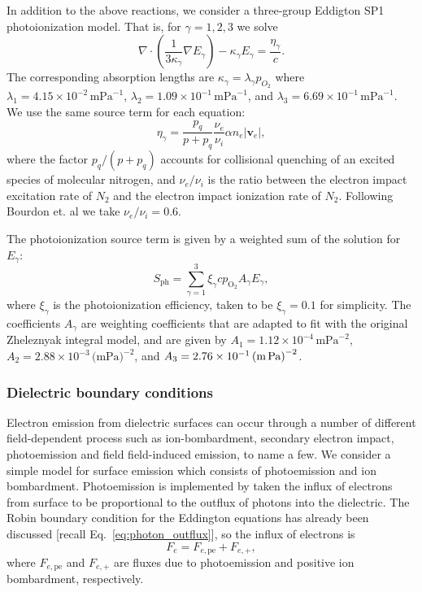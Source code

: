 \documentclass[3p]{elsarticle}
\begin{document}
In addition to the above reactions, we consider a three-group Eddigton SP1 photoionization model. That is, for $\gamma = 1, 2, 3$ we solve
\begin{equation}
  \nabla\cdot\left(\frac{1}{3\kappa_\gamma}\nabla E_\gamma\right) - \kappa_\gamma E_\gamma = \frac{\eta_\gamma}{c}. 
\end{equation}
The corresponding absorption lengths are $\kappa_\gamma = \lambda_\gamma p_{O_2}$ where $\lambda_1 = 4.15\times 10^{-2}\,\text{mPa}^{-1}$, $\lambda_2 = 1.09\times 10^{-1}\,\text{mPa}^{-1}$, and $\lambda_3 = 6.69\times 10^{-1}\,\text{mPa}^{-1}$. We use the same source term for each equation:
\begin{equation}
  \eta_\gamma = \frac{p_q}{p + p_q}\frac{\nu_e}{\nu_i}\alpha n_e\left|\bm{v}_e\right|,
\end{equation}
where the factor $p_q/(p+p_q)$ accounts for collisional quenching of an excited species of molecular nitrogen, and $\nu_e/\nu_i$ is the ratio between the electron impact excitation rate of $N_2$ and the electron impact ionization rate of $N_2$. Following Bourdon et. al we take $\nu_e/\nu_i = 0.6$.

The photoionization source term is given by a weighted sum of the solution for $E_\gamma$:
\begin{equation}
  S_{\text{ph}} = \sum_{\gamma = 1}^3 \xi_\gamma c p_{\text{O}_2}A_\gamma E_\gamma,
\end{equation}
where $\xi_\gamma$ is the photoionization efficiency, taken to be $\xi_\gamma = 0.1$ for simplicity. The coefficients $A_\gamma$ are weighting coefficients that are adapted to fit with the original Zheleznyak integral model, and are given by $A_1 = 1.12\times 10^{-4}\,\text{mPa}^{-2}$, $A_2 = 2.88\times 10^{-3}\,\text{(mPa)}^{-2}$, and $A_3 = 2.76\times 10^{-1}\,\text{(m\,Pa)}^{-2}$.

\subsubsection{Dielectric boundary conditions}
Electron emission from dielectric surfaces can occur through a number of different field-dependent process such as ion-bombardment, secondary electron impact, photoemission and field field-induced emission, to name a few. We consider a simple model for surface emission which consists of photoemission and ion bombardment. Photoemission is implemented by taken the influx of electrons from surface to be proportional to the outflux of photons into the dielectric. The Robin boundary condition for the Eddington equations has already been discussed [recall Eq.~\eqref{eq:photon_outflux}], so the influx of electrons is
\begin{equation}
  F_e = F_{e, \text{pe}} + F_{e, +},
\end{equation}
where $F_{e, \text{pe}}$ and $F_{e, +}$ are fluxes due to photoemission and positive ion bombardment, respectively. 
\end{document}
